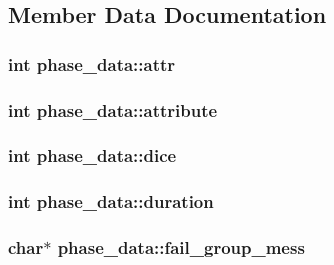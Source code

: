 \subsection{Member Data Documentation}
\hypertarget{structphase__data_a4e4e14095ec3bf8768d18863e58c9b7e}{
\subsubsection[{attr}]{\setlength{\rightskip}{0pt plus 5cm}int phase\-\_\-data\-::attr}}\label{structphase__data_a4e4e14095ec3bf8768d18863e58c9b7e}
\hypertarget{structphase__data_a5e00aebd5e8ce8a4c25176dd7845c87f}{
\subsubsection[{attribute}]{\setlength{\rightskip}{0pt plus 5cm}int phase\-\_\-data\-::attribute}}\label{structphase__data_a5e00aebd5e8ce8a4c25176dd7845c87f}
\hypertarget{structphase__data_a992801e12a392136950a9781cf468ebe}{
\subsubsection[{dice}]{\setlength{\rightskip}{0pt plus 5cm}int phase\-\_\-data\-::dice}}\label{structphase__data_a992801e12a392136950a9781cf468ebe}
\hypertarget{structphase__data_a9cbd274561249b0a38609a352674184d}{
\subsubsection[{duration}]{\setlength{\rightskip}{0pt plus 5cm}int phase\-\_\-data\-::duration}}\label{structphase__data_a9cbd274561249b0a38609a352674184d}
\hypertarget{structphase__data_a2bc2d03f876c0daeda0e500214108ff3}{
\subsubsection[{fail\-\_\-group\-\_\-mess}]{\setlength{\rightskip}{0pt plus 5cm}char$\ast$ phase\-\_\-data\-::fail\-\_\-group\-\_\-mess}}\label{structphase__data_a2bc2d03f876c0daeda0e500214108ff3}
